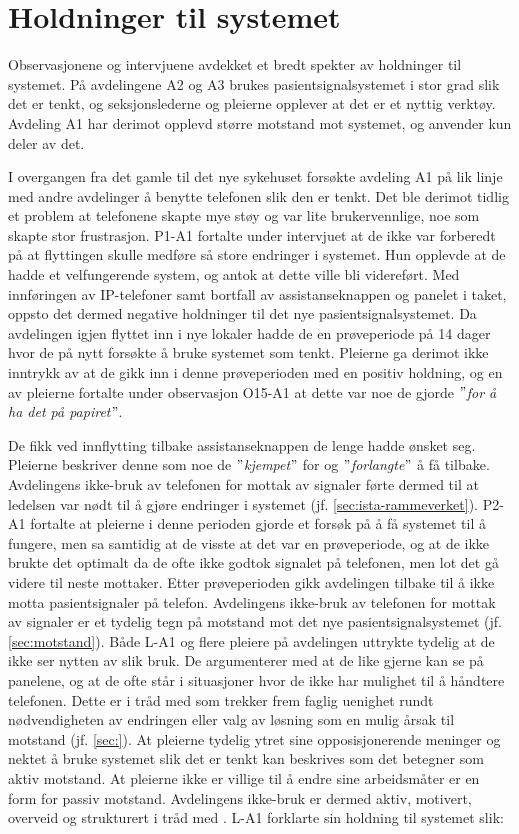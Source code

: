 \section{Holdninger til systemet}
Observasjonene og intervjuene avdekket et bredt spekter av holdninger til systemet. På avdelingene A2 og A3 brukes pasientsignalsystemet i stor grad slik det er tenkt, og seksjonslederne og pleierne opplever at det er et nyttig verktøy. Avdeling A1 har derimot opplevd større motstand mot systemet, og anvender kun deler av det.

\noindent
I overgangen fra det gamle til det nye sykehuset forsøkte avdeling A1 på lik linje med andre avdelinger å benytte telefonen slik den er tenkt. Det ble derimot tidlig et problem at telefonene skapte mye støy og var lite brukervennlige, noe som skapte stor frustrasjon. P1-A1 fortalte under intervjuet at de ikke var forberedt på at flyttingen skulle medføre så store endringer i systemet. Hun opplevde at de hadde et velfungerende system, og antok at dette ville bli videreført. Med innføringen av IP-telefoner samt bortfall av assistanseknappen og panelet i taket, oppsto det dermed negative holdninger til det nye pasientsignalsystemet. Da avdelingen igjen flyttet inn i nye lokaler hadde de en prøveperiode på 14 dager hvor de på nytt forsøkte å bruke systemet som tenkt. Pleierne ga derimot ikke inntrykk av at de gikk inn i denne prøveperioden med en positiv holdning, og en av pleierne fortalte under observasjon O15-A1 at dette var noe de gjorde \textit{$"$for å ha det på papiret$"$}. 

\noindent
De fikk ved innflytting tilbake assistanseknappen de lenge hadde ønsket seg. Pleierne beskriver denne som noe de \textit{$"$kjempet$"$} for og \textit{$"$forlangte$"$} å få tilbake. Avdelingens ikke-bruk av telefonen for mottak av signaler førte dermed til at ledelsen var nødt til å gjøre endringer i systemet (jf. \ref{sec:ista-rammeverket}). P2-A1 fortalte at pleierne i denne perioden gjorde et forsøk på å få systemet til å fungere, men sa samtidig at de visste at det var en prøveperiode, og at de ikke brukte det optimalt da de ofte ikke godtok signalet på telefonen, men lot det gå videre til neste mottaker. Etter prøveperioden gikk avdelingen tilbake til å ikke motta pasientsignaler på telefon. Avdelingens ikke-bruk av telefonen for mottak av signaler er et tydelig tegn på motstand mot det nye pasientsignalsystemet (jf. \ref{sec:motstand}). Både L-A1 og flere pleiere på avdelingen uttrykte tydelig at de ikke ser nytten av slik bruk. De argumenterer med at de like gjerne kan se på panelene, og at de ofte står i situasjoner hvor de ikke har mulighet til å håndtere telefonen. Dette er i tråd med \citet{Jacobsen12} som trekker frem faglig uenighet rundt nødvendigheten av endringen eller valg av løsning som en mulig årsak til motstand (jf. \ref{sec:}). At pleierne tydelig ytret sine opposisjonerende meninger og nektet å bruke systemet slik det er tenkt kan beskrives som det \citet{Lapointe05} betegner som aktiv motstand. At pleierne ikke er villige til å endre sine arbeidsmåter er en form for passiv motstand. Avdelingens ikke-bruk er dermed aktiv, motivert, overveid og strukturert i tråd med \citet{Satchell09}. L-A1 forklarte sin holdning til systemet slik: 

